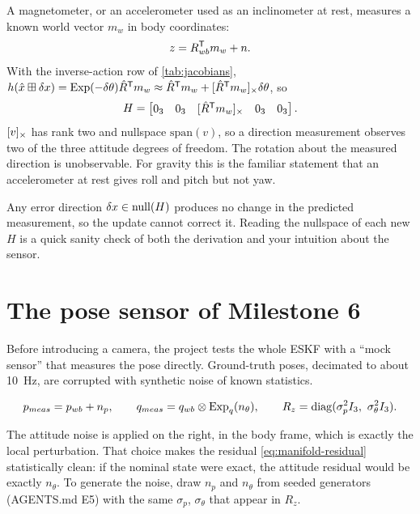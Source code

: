 A magnetometer, or an accelerometer used as an inclinometer at rest, measures a known world vector $m_w$ in
body coordinates:
\begin{equation}
  z = R_{wb}^{\mathsf{T}} m_w + n .
\end{equation}
With the inverse-action row of \cref{tab:jacobians}, $h(\hat x\boxplus\delta x) = \operatorname{Exp}(-\delta\theta)\hat R^{\mathsf{T}} m_w \approx \hat R^{\mathsf{T}} m_w +
[\hat R^{\mathsf{T}} m_w]_{\times}\delta\theta$, so
\begin{equation}
  H = \begin{bmatrix} 0_3 & 0_3 & [\hat R^{\mathsf{T}} m_w]_{\times} & 0_3 & 0_3 \end{bmatrix}.
\end{equation}
$[v]_{\times}$ has rank two and nullspace $\mathrm{span}(v)$, so a direction measurement observes two of the three attitude
degrees of freedom. The rotation about the measured direction is unobservable. For gravity this is the
familiar statement that an accelerometer at rest gives roll and pitch but not yaw.

\begin{keyidea}
Any error direction $\delta x \in \operatorname{null}(H)$ produces no change in the predicted measurement, so the update cannot
correct it. Reading the nullspace of each new $H$ is a quick sanity check of both the derivation and your
intuition about the sensor.
\end{keyidea}

\section{The pose sensor of Milestone 6}

Before introducing a camera, the project tests the whole ESKF with a ``mock sensor'' that measures the pose
directly. Ground-truth poses, decimated to about 10~Hz, are corrupted with synthetic noise of known statistics.

\begin{convention}
\begin{equation}
  p_{meas} = p_{wb} + n_p, \qquad q_{meas} = q_{wb}\otimes\operatorname{Exp}_q(n_\theta), \qquad
  R_z = \operatorname{diag}(\sigma_p^2 I_3,\ \sigma_\theta^2 I_3).
\end{equation}
\end{convention}

The attitude noise is applied on the right, in the body frame, which is exactly the local perturbation. That
choice makes the residual \eqref{eq:manifold-residual} statistically clean: if the nominal state were exact, the
attitude residual would be exactly $n_\theta$. To generate the noise, draw $n_p$ and $n_\theta$ from seeded
 generators (AGENTS.md E5) with the same $\sigma_p$, $\sigma_\theta$ that appear in $R_z$.

